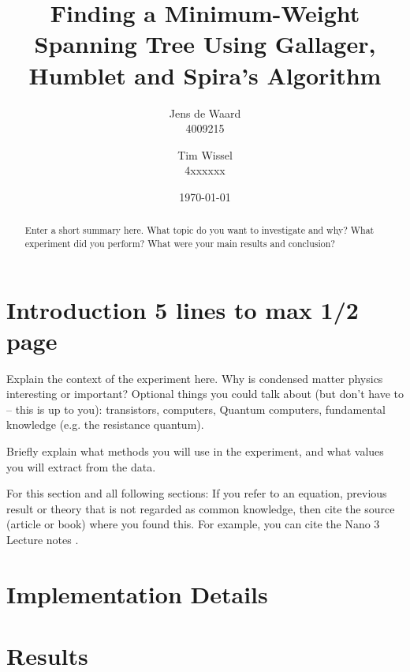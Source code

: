 \documentclass[a4paper]{article}
\title{Finding a Minimum-Weight Spanning Tree Using Gallager, Humblet and Spira's Algorithm}
\author{Jens de Waard \\ 4009215 \and Tim Wissel \\ 4xxxxxx}
\date{\today}
\begin{document}
\maketitle

\begin{abstract}
Enter a short summary here. What topic do you want to investigate and why? What experiment did you perform? What were your main results and conclusion?
\end{abstract}

\tableofcontents

\section{Introduction 5 lines to max 1/2 page}
\label{sec:introduction}

Explain the context of the experiment here. Why is condensed matter physics interesting or important?
Optional things you could talk about (but don't have to -- this is up to you): transistors, computers, Quantum computers, fundamental knowledge (e.g. the resistance quantum).

Briefly explain what methods you will use in the experiment, and what values you will extract from the data.

For this section and all following sections: If you refer to an equation, previous result or theory that is not regarded as common knowledge, then cite the source (article or book) where you found this. For example, you can cite the Nano 3 Lecture notes \cite{nano3}.

\section{Implementation Details}
\label{sec:implementation}

\section{Results}
\label{sec:results}
\end{document}
